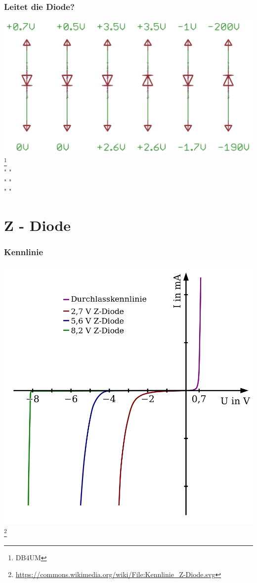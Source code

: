 \begin{frame}
    \frametitle{Leitet die Diode?}
    \begin{center}
        \includegraphics[width=1\textwidth]{e12/Leit_Diode.png}         \footnote{\tiny DB4UM} \\ " "\\ " " \\ " "
	\end{center}
\end{frame}


\section*{Z - Diode}

\begin{frame}
    \frametitle{Kennlinie}
    \begin{center}
        \includegraphics[width=.7\textwidth]{e12/Kennlinie_Z-Diode.png}
        \footnote{\tiny \url{https://commons.wikimedia.org/wiki/File:Kennlinie_Z-Diode.svg}}
	\end{center}
\end{frame}

